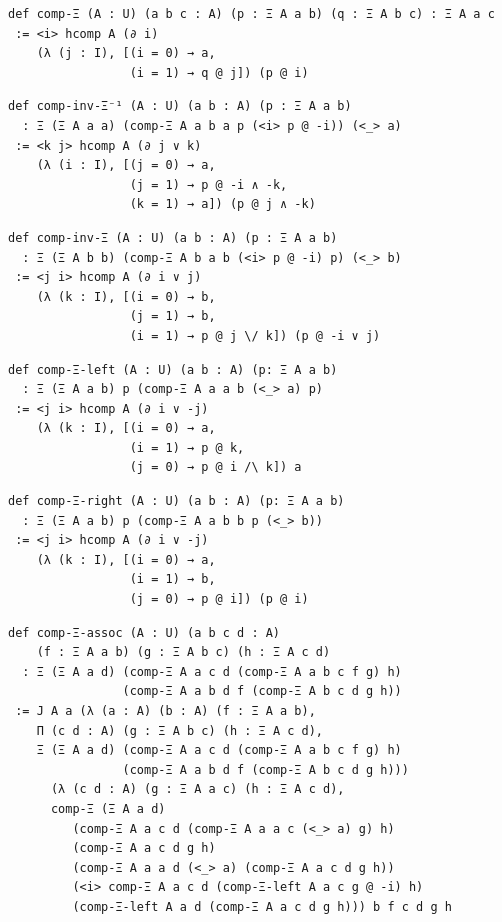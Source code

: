 \documentclass{article}
\begin{document}
\begin{lstlisting}
def comp-Ξ (A : U) (a b c : A) (p : Ξ A a b) (q : Ξ A b c) : Ξ A a c
 := <i> hcomp A (∂ i)
    (λ (j : I), [(i = 0) → a,
                 (i = 1) → q @ j]) (p @ i)
\end{lstlisting}

\begin{lstlisting}
def comp-inv-Ξ⁻¹ (A : U) (a b : A) (p : Ξ A a b)
  : Ξ (Ξ A a a) (comp-Ξ A a b a p (<i> p @ -i)) (<_> a)
 := <k j> hcomp A (∂ j ∨ k)
    (λ (i : I), [(j = 0) → a,
                 (j = 1) → p @ -i ∧ -k,
                 (k = 1) → a]) (p @ j ∧ -k)
\end{lstlisting}

\begin{lstlisting}
def comp-inv-Ξ (A : U) (a b : A) (p : Ξ A a b)
  : Ξ (Ξ A b b) (comp-Ξ A b a b (<i> p @ -i) p) (<_> b)
 := <j i> hcomp A (∂ i ∨ j)
    (λ (k : I), [(i = 0) → b,
                 (j = 1) → b,
                 (i = 1) → p @ j \/ k]) (p @ -i ∨ j)
\end{lstlisting}

\begin{lstlisting}
def comp-Ξ-left (A : U) (a b : A) (p: Ξ A a b)
  : Ξ (Ξ A a b) p (comp-Ξ A a a b (<_> a) p)
 := <j i> hcomp A (∂ i ∨ -j)
    (λ (k : I), [(i = 0) → a,
                 (i = 1) → p @ k,
                 (j = 0) → p @ i /\ k]) a
\end{lstlisting}

\begin{lstlisting}
def comp-Ξ-right (A : U) (a b : A) (p: Ξ A a b)
  : Ξ (Ξ A a b) p (comp-Ξ A a b b p (<_> b))
 := <j i> hcomp A (∂ i ∨ -j)
    (λ (k : I), [(i = 0) → a,
                 (i = 1) → b,
                 (j = 0) → p @ i]) (p @ i)
\end{lstlisting}

\begin{lstlisting}
def comp-Ξ-assoc (A : U) (a b c d : A)
    (f : Ξ A a b) (g : Ξ A b c) (h : Ξ A c d)
  : Ξ (Ξ A a d) (comp-Ξ A a c d (comp-Ξ A a b c f g) h)
                (comp-Ξ A a b d f (comp-Ξ A b c d g h))
 := J A a (λ (a : A) (b : A) (f : Ξ A a b),
    Π (c d : A) (g : Ξ A b c) (h : Ξ A c d),
    Ξ (Ξ A a d) (comp-Ξ A a c d (comp-Ξ A a b c f g) h)
                (comp-Ξ A a b d f (comp-Ξ A b c d g h)))
      (λ (c d : A) (g : Ξ A a c) (h : Ξ A c d),
      comp-Ξ (Ξ A a d)
         (comp-Ξ A a c d (comp-Ξ A a a c (<_> a) g) h)
         (comp-Ξ A a c d g h)
         (comp-Ξ A a a d (<_> a) (comp-Ξ A a c d g h))
         (<i> comp-Ξ A a c d (comp-Ξ-left A a c g @ -i) h)
         (comp-Ξ-left A a d (comp-Ξ A a c d g h))) b f c d g h
\end{lstlisting}
\end{document}
